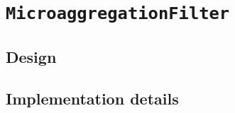 \section{\texttt{MicroaggregationFilter}}
\label{Implementation:Microaggregation}

\subsection{Design}
\label{Implementation:Microaggregation:Design}

\subsection{Implementation details}
\label{Implementation:Microaggregation:Details}
